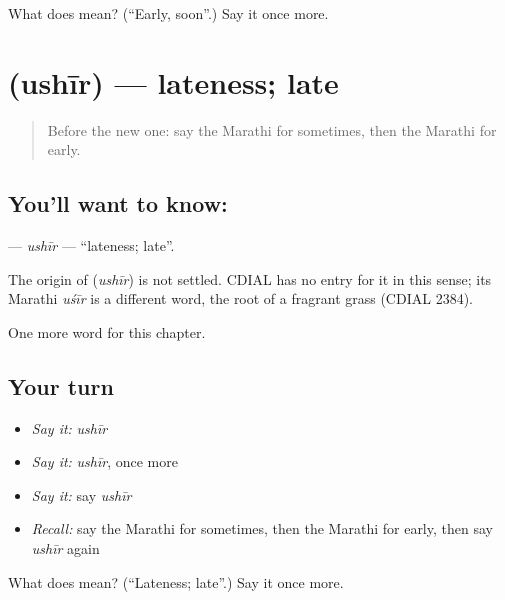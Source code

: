 \begin{tcolorbox}[breakable,colback=teal!4,colframe=teal!35!black,title={Before you move on}]
What does  mean? (\textquotedblleft{}Early, soon\textquotedblright{}.) Say it once more.
\end{tcolorbox}
\section[\texorpdfstring{\mr{उशीर} (ushīr)}{उशीर (ushīr)}]{ (ushīr) — lateness; late}

\label{lesson:MR-C111-ushir}



\begin{quote}
Before the new one: say the Marathi for sometimes, then the Marathi for early.
\end{quote}

\subsection*{You'll want to know: }
\textbf{} — \emph{ushīr} — \textquotedblleft{}lateness; late\textquotedblright{}.

\begin{cousinweb}
The origin of \textbf{} (\emph{ushīr}) is not settled. CDIAL has no entry for it in this sense; its Marathi \emph{uśīr} is a different word, the root of a fragrant grass (CDIAL 2384).
\end{cousinweb}

\begin{grammarlens}[title={What you've built}]
One more word for this chapter.
\end{grammarlens}

\subsection*{Your turn}
\begin{itemize}
\raggedright
  \item \emph{Say it:} \emph{ushīr}
  \item \emph{Say it:} \emph{ushīr}, once more
  \item \emph{Say it:} say \emph{ushīr}
  \item \emph{Recall:} say the Marathi for sometimes, then the Marathi for early, then say \emph{ushīr} again
\end{itemize}

\begin{tcolorbox}[breakable,colback=teal!4,colframe=teal!35!black,title={Before you move on}]
What does  mean? (\textquotedblleft{}Lateness; late\textquotedblright{}.) Say it once more.
\end{tcolorbox}
